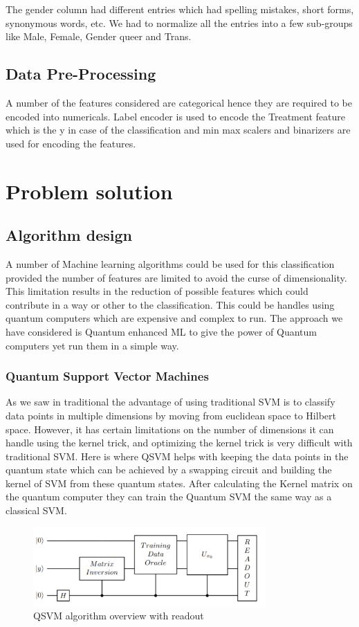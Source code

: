 \documentclass[10pt,journal,compsoc]{IEEEtran}
\begin{document}
\quad The gender column had different entries which had spelling mistakes, short forms, synonymous words, etc. We had to normalize all the entries into a few sub-groups like Male, Female, Gender queer and Trans. 

\subsection{Data Pre-Processing}
A number of the features considered are categorical hence they are required to be encoded into numericals. Label encoder is used to encode the Treatment feature which is the y in case of the classification and min max scalers and binarizers are used for encoding the features.

\section{Problem solution}
\subsection{Algorithm design}
A number of Machine learning algorithms could be used for this classification provided the number of features are limited to avoid the curse of dimensionality. This limitation results in the reduction of possible features which could contribute in a way or other to the classification. This could be handles using quantum computers which are expensive and complex to run. The approach we have considered is Quantum enhanced ML to give the power of Quantum computers yet run them in a simple way.

\subsubsection{Quantum Support Vector Machines}
As we saw in traditional the advantage of using traditional SVM is to classify data points in multiple dimensions by moving from euclidean space to Hilbert space. However, it has certain limitations on the number of dimensions it can handle using the kernel trick, and optimizing the kernel trick is very difficult with traditional SVM. Here is where QSVM helps with keeping the data points in the quantum state which can be achieved by a swapping circuit and building the kernel of SVM from these quantum states. After calculating the Kernel matrix on the quantum computer they can train the Quantum SVM the same way as a classical SVM. 
\begin{figure}[h]
\centering
\includegraphics[width=3.5in]{6.png}
\caption{QSVM algorithm overview with readout}
\end{figure}
\end{document}
